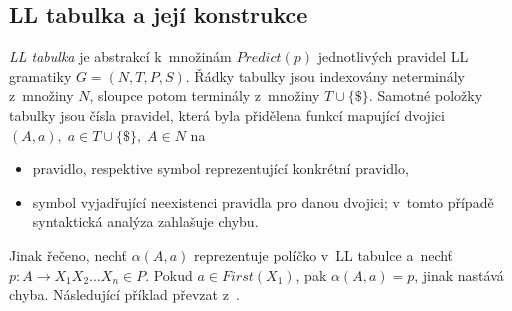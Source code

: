 \subsection*{LL tabulka a její konstrukce}
\emph{LL tabulka} je abstrakcí k~množinám $Predict(p)$ jednotlivých pravidel LL gramatiky $G = (N, T, P, S)$.
Řádky tabulky jsou indexovány neterminály z~množiny $N$, sloupce potom terminály z~množiny $T \cup \{\$\}$.
Samotné položky tabulky jsou čísla pravidel, která byla přidělena funkcí mapující dvojici $(A, a),\; a \in T \cup \{\$\},\; A \in N$ na 
\begin{itemize}
    \item pravidlo, respektive symbol reprezentující konkrétní pravidlo,
    \item symbol vyjadřující neexistenci pravidla pro danou dvojici; v~tomto případě syntaktická analýza zahlašuje chybu.
\end{itemize}
Jinak řečeno, nechť $\alpha(A, a)$ reprezentuje políčko v~LL tabulce a~nechť $p: A \rightarrow X_1X_2\ldots X_n \in P$.
Pokud $a \in First(X_1)$, pak $\alpha(A, a) = p$, jinak nastává chyba.
Následující příklad převzat z~\cite{medunaElementsOfCompDesign}.
